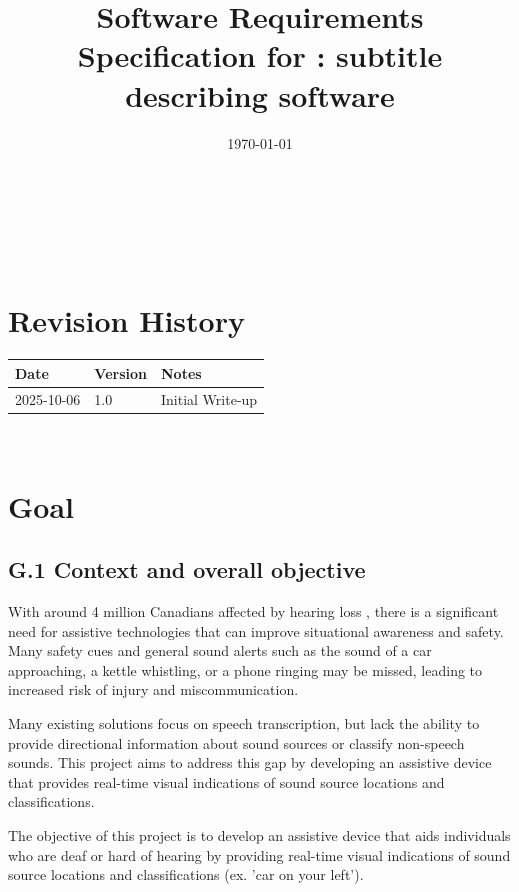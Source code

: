 \documentclass[12pt]{article}
\theoremstyle{definition}
\begin{document}
\title{Software Requirements Specification for \progname: subtitle describing software} 
\author{\authname}
\date{\today}
	
\maketitle

~\newpage


\tableofcontents

~\newpage

\section*{Revision History}


\begin{tabularx}{\textwidth}{p{3cm}p{2cm}X}
\toprule {\bf Date} & {\bf Version} & {\bf Notes}\\
\midrule
2025-10-06 & 1.0 & Initial Write-up\\
\bottomrule
\end{tabularx}


~\newpage

\section{Goal}

\subsection{G.1 Context and overall objective}

With around 4 million Canadians affected by hearing loss \cite{Healthing2025}, 
there is a significant need for assistive technologies that can improve 
situational awareness and safety.
Many safety cues and general sound alerts such as the sound of a car 
approaching, a kettle whistling,
or a phone ringing may be missed, leading to increased risk of injury and
miscommunication.

Many existing solutions focus on speech transcription, but lack the ability to
provide directional information about sound sources or classify non-speech
sounds. This project aims to address this gap by developing an assistive device
that provides real-time visual indications of sound source locations and 
classifications.

The objective of this project is to develop an assistive device that aids
individuals who are deaf or hard of hearing by providing real-time visual
indications of sound source locations and classifications (ex. 'car on your 
left').
\end{document}

